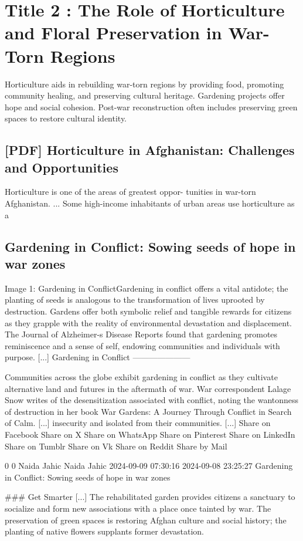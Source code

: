 \documentclass[12pt]{article}
\begin{document}
\section{Title 2 : The Role of Horticulture and Floral Preservation in  War-Torn Regions}
Horticulture aids in rebuilding war-torn regions by providing food, promoting community healing, and preserving cultural heritage. Gardening projects offer hope and social cohesion. Post-war reconstruction often includes preserving green spaces to restore cultural identity.\subsection{[PDF] Horticulture in Afghanistan: Challenges and Opportunities}
Horticulture is one of the areas of greatest oppor- tunities in war-torn Afghanistan. ... Some high-income inhabitants of urban areas use horticulture as a\subsection{Gardening in Conflict: Sowing seeds of hope in war zones}
Image 1: Gardening in ConflictGardening in conflict offers a vital antidote; the planting of seeds is analogous to the transformation of lives uprooted by destruction. Gardens offer both symbolic relief and tangible rewards for citizens as they grapple with the reality of environmental devastation and displacement. The Journal of Alzheimer-s Disease Reports found that gardening promotes reminiscence and a sense of self, endowing communities and individuals with purpose. [...] Gardening in Conflict
---------------------

Communities across the globe exhibit gardening in conflict as they cultivate alternative land and futures in the aftermath of war. War correspondent Lalage Snow writes of the desensitization associated with conflict, noting the wantonness of destruction in her book War Gardens: A Journey Through Conflict in Search of Calm. [...] insecurity and isolated from their communities. [...] Share on Facebook
   Share on X
   Share on WhatsApp
   Share on Pinterest
   Share on LinkedIn
   Share on Tumblr
   Share on Vk
   Share on Reddit
   Share by Mail

 0 0 Naida Jahic  Naida Jahic 2024-09-09 07:30:16 2024-09-08 23:25:27 Gardening in Conflict: Sowing seeds of hope in war zones

\#\#\# Get Smarter [...] The rehabilitated garden provides citizens a sanctuary to socialize and form new associations with a place once tainted by war. The preservation of green spaces is restoring Afghan culture and social history; the planting of native flowers supplants former devastation.
\end{document}
